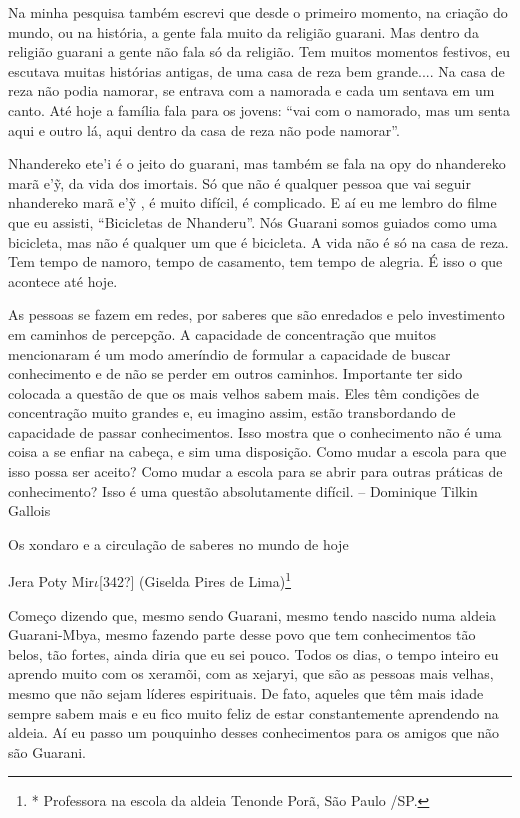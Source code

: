 \documentclass{article}
\begin{document}
Na minha pesquisa tamb\'em escrevi que desde o primeiro momento, na
cria\c{c}\~ao do mundo, ou na hist\'oria, a gente fala muito da
religi\~ao guarani. Mas dentro da religi\~ao guarani a gente n\~ao fala
s\'o da religi\~ao. Tem muitos momentos festivos, eu escutava muitas
hist\'orias antigas, de uma casa de reza bem grande.... Na casa de reza
n\~ao podia namorar, se entrava com a namorada e cada um sentava em um
canto. At\'e hoje a fam\'ilia fala para os jovens:
{\textquotedblleft}vai com o namorado, mas um senta aqui e outro l\'a,
aqui dentro da casa de reza n\~ao pode namorar{\textquotedblright}.

Nhandereko ete{\textquoteright}i \'e o jeito do guarani, mas tamb\'em se
fala na opy do nhandereko mar\~a e{\textquoteright}\~{y}, da vida dos
imortais. S\'o que n\~ao \'e qualquer pessoa que vai seguir nhandereko
mar\~a e{\textquoteright}\~{y} , \'e muito dif\'icil, \'e complicado. E
a\'i eu me lembro do filme que eu assisti,
{\textquotedblleft}Bicicletas de Nhanderu{\textquotedblright}. N\'os
Guarani somos guiados como uma bicicleta, mas n\~ao \'e qualquer um que
\'e bicicleta. A vida n\~ao \'e s\'o na casa de reza. Tem tempo de
namoro, tempo de casamento, tem tempo de alegria. \'E isso o que
acontece at\'e hoje.

As pessoas se fazem em redes, por saberes que s\~ao enredados e pelo
investimento em caminhos de percep\c{c}\~ao. A capacidade de
concentra\c{c}\~ao que muitos mencionaram \'e um modo amer\'indio de
formular a capacidade de buscar conhecimento e de n\~ao se perder em
outros caminhos. Importante ter sido colocada a quest\~ao de que os
mais velhos sabem mais. Eles t\^em condi\c{c}\~oes de
concentra\c{c}\~ao muito grandes e, eu imagino assim, est\~ao
transbordando de capacidade de passar conhecimentos. Isso mostra que o
conhecimento n\~ao \'e uma coisa a se enfiar na cabe\c{c}a, e sim uma
disposi\c{c}\~ao. Como mudar a escola para que isso possa ser aceito?
Como mudar a escola para se abrir para outras pr\'aticas de
conhecimento? Isso \'e uma quest\~ao absolutamente dif\'icil. --
Dominique Tilkin Gallois

Os xondaro e a circula\c{c}\~ao de saberes no mundo de hoje

Jera Poty Mir$\iota $[342?] (Giselda Pires de Lima)\footnote{*
Professora na escola da aldeia Tenonde Por\~a, S\~ao Paulo /SP.}  

Come\c{c}o dizendo que, mesmo sendo Guarani, mesmo tendo nascido numa
aldeia Guarani-Mbya, mesmo fazendo parte desse povo que tem
conhecimentos t\~ao belos, t\~ao fortes, ainda diria que eu sei pouco.
Todos os dias, o tempo inteiro eu aprendo muito com os xeram\~oi, com
as xejaryi, que s\~ao as pessoas mais velhas, mesmo que n\~ao sejam
l\'ideres espirituais. De fato, aqueles que t\^em mais idade sempre
sabem mais e eu fico muito feliz de estar constantemente aprendendo na
aldeia. A\'i eu passo um pouquinho desses conhecimentos para os amigos
que n\~ao s\~ao Guarani.
\end{document}
